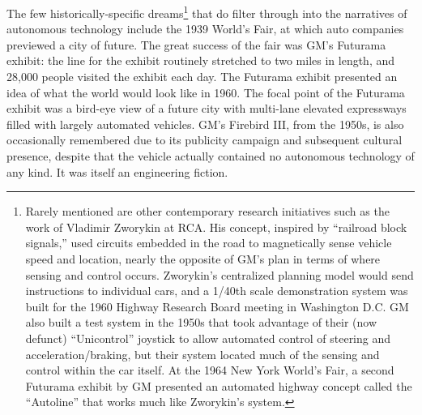 The few historically-specific 
dreams\footnote{Rarely mentioned are other contemporary research
  initiatives such as the work of Vladimir Zworykin at RCA. His
  concept, inspired by “railroad block signals,” used circuits
  embedded in the road to magnetically sense vehicle speed and
  location, nearly the opposite of GM's plan in terms of where sensing
and control occurs.\cite[p. 9]{wetmore} Zworykin's centralized planning model would send
instructions to individual cars, and a 1/40th scale demonstration
system was built for the 1960 Highway Research Board meeting in
Washington D.C. GM also built a test system in the 1950s that took
advantage of their (now defunct) ``Unicontrol'' joystick to allow
automated control of steering and acceleration/braking, but their
system located much of the sensing and control within the car
itself.\cite[p. 8]{wetmore} At the 1964 New York World's Fair, a
second Futurama exhibit by GM presented an automated highway concept
called the ``Autoline'' that works much like Zworykin's
system.\cite[p. 9]{wetmore}} that do filter through into the narratives of autonomous
technology\cite{CBSPetersen} include the 1939 World's Fair, at which auto companies
previewed a city of future. The great success of the fair was GM's
Futurama exhibit: the line for the exhibit routinely stretched to two
miles in length, and 28,000 people visited the exhibit each day. The
Futurama exhibit presented an idea of what the world would look like
in 1960.\cite[p. 371]{nyeElectrifying} The focal point of the Futurama
exhibit was a bird-eye view of a future city with multi-lane elevated
expressways filled with largely automated vehicles. GM's Firebird III,
from the 1950s, is also occasionally remembered due to its publicity campaign and
subsequent cultural presence,\cite{walshVs} despite that the vehicle actually
contained no autonomous technology of any kind.\cite[p. 7]{wetmore} It was
itself an engineering fiction. 

